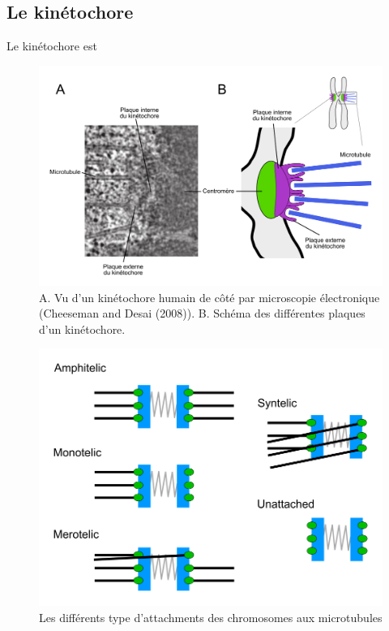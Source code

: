 \documentclass[12pt,a4paper,twoside,openright]{book}
\begin{document}
\subsection{Le kinétochore}\label{le-kinuxe9tochore}

Le kinétochore est

\begin{figure}[htbp]
\centering
\includegraphics{figures/intro/kt.png}
\caption{A. Vu d'un kinétochore humain de côté par microscopie
électronique (Cheeseman and Desai (2008)). B. Schéma des différentes
plaques d'un kinétochore. \label{kt}}
\end{figure}

\begin{figure}[htbp]
\centering
\includegraphics{figures/intro/attachments.png}
\caption{Les différents type d'attachments des chromosomes aux
microtubules}
\end{figure}
\end{document}
